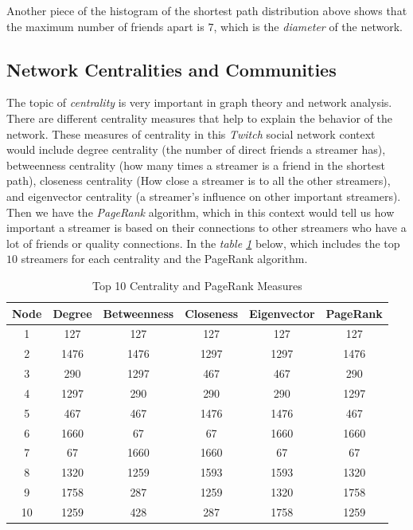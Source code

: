 \documentclass[10pt]{article}
\begin{document}
Another piece of the histogram of the shortest path distribution above shows
that the maximum number of friends apart is $7$, which is the \textit{diameter}
of the network.


\subsection{Network Centralities and Communities}

The topic of \textit{centrality} is very important in graph theory and network analysis.
There are different centrality measures that help to explain the behavior of the
network. These measures of centrality in this \textit{Twitch} social network context
would include degree centrality (the number of direct friends a streamer has),
betweenness centrality (how many times a streamer is a friend in the shortest
path), closeness centrality (How close a streamer is to all the other streamers),
and eigenvector centrality (a streamer's influence on other important streamers).
Then we have the \textit{PageRank} algorithm, which in this context would tell us how
important a streamer is based on their connections to other streamers who have
a lot of friends or quality connections. In the \textit{table \ref{tab:centrality}}
below, which includes the top $10$ streamers for each centrality and the PageRank
algorithm.

\begin{table}[H]
\footnotesize
\centering
\begin{tabular}{|c|c|c|c|c|c|}
\hline
    \bf{Node} & \bf{Degree} & \bf{Betweenness} & \bf{Closeness}
    & \bf{Eigenvector} & \bf{PageRank} \\
\hline
    1 & 127 & 127 & 127 & 127 & 127 \\
    2 & 1476 & 1476 & 1297 & 1297 & 1476 \\
    3 & 290 & 1297 & 467 & 467 & 290 \\
    4 & 1297 & 290 & 290 & 290 & 1297 \\
    5 & 467 & 467 & 1476 & 1476 & 467 \\
    6 & 1660 & 67 & 67 & 1660 & 1660 \\
    7 & 67 & 1660 & 1660 & 67 & 67 \\
    8 & 1320 & 1259 & 1593 & 1593 & 1320 \\
    9 & 1758 & 287 & 1259 & 1320 & 1758 \\
    10 & 1259 & 428 & 287 & 1758 & 1259 \\
\hline
\end{tabular}
\caption{Top 10 Centrality and PageRank Measures}
\label{tab:centrality}
\end{table}
\end{document}
